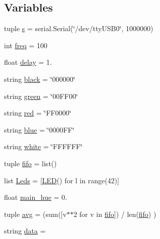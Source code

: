 \subsection*{Variables}
\begin{DoxyCompactItemize}
\item 
tuple \hyperlink{namespacetest__lamp__2_a589a584a123d57bac1e1f2b7103f583c}{s} = serial.\+Serial(\char`\"{}/dev/tty\+U\+S\+B0\char`\"{}, 1000000)
\item 
int \hyperlink{namespacetest__lamp__2_ab35fca949f5807e379fd240b1f552dbb}{freq} = 100
\item 
float \hyperlink{namespacetest__lamp__2_a06d775c6da2590ec490d13f7270b002b}{delay} = 1.
\item 
string \hyperlink{namespacetest__lamp__2_a8bde3709dee4d6a3b8702bf533fa058c}{black} = \char`\"{}000000\char`\"{}
\item 
string \hyperlink{namespacetest__lamp__2_ac7d7d6234740e9f61a277ad4cb312dc5}{green} = \char`\"{}00\+F\+F00\char`\"{}
\item 
string \hyperlink{namespacetest__lamp__2_a17152f1d5cbd5d9abe0446163c599058}{red} = \char`\"{}F\+F0000\char`\"{}
\item 
string \hyperlink{namespacetest__lamp__2_ab3d38f2c4ee21e6f07f9d8dacef83a6c}{blue} = \char`\"{}0000\+F\+F\char`\"{}
\item 
string \hyperlink{namespacetest__lamp__2_a331b2516047417e2208f8485dc76c817}{white} = \char`\"{}F\+F\+F\+F\+F\+F\char`\"{}
\item 
tuple \hyperlink{namespacetest__lamp__2_a8a62cf9927e76408d02edd83a3999b21}{fifo} = list()
\item 
list \hyperlink{namespacetest__lamp__2_ade26824270e8518c4b82732d0cb1e38c}{Leds} = \mbox{[}\hyperlink{classtest__lamp__2_1_1LED}{L\+E\+D}() for l in range(42)\mbox{]}
\item 
float \hyperlink{namespacetest__lamp__2_a490769957edf0203bf54b6e8169f3b11}{main\+\_\+hue} = 0.
\item 
tuple \hyperlink{namespacetest__lamp__2_aeb773a5375faaf37a8dd984b7c8c1570}{avg} = (sum(\mbox{[}v$\ast$$\ast$2 for v in \hyperlink{namespacetest__lamp__2_a8a62cf9927e76408d02edd83a3999b21}{fifo}\mbox{]}) / len(\hyperlink{namespacetest__lamp__2_a8a62cf9927e76408d02edd83a3999b21}{fifo}) )
\item 
string \hyperlink{namespacetest__lamp__2_a980a603f356850f41fe96b73cbe1c759}{data} = \textquotesingle{}\textquotesingle{}
\end{DoxyCompactItemize}


